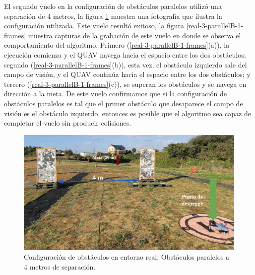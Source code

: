 El segundo vuelo en la configuración de obstáculos paralelos utilizó una separación de 4 metros, la figura \ref{real-3-parallelB-0-config} muestra una fotografía que ilustra la configuración utilizada. Este vuelo resultó exitoso, la figura \ref{real-3-parallelB-1-frames} muestra capturas de la grabación de este vuelo en donde se observa el comportamiento del algoritmo. Primero (\ref{real-3-parallelB-1-frames}(a)), la ejecución comienza y el QUAV navega hacia el espacio entre los dos obstáculos; segundo (\ref{real-3-parallelB-1-frames}(b)), esta vez, el obstáculo izquierdo sale del campo de visión, y el QUAV continúa hacia el espacio entre los dos obstáculos; y tercero (\ref{real-3-parallelB-1-frames}(c)), se superan los obstáculos y se navega en dirección a la meta. De este vuelo confirmamos que si la configuración de obstáculos paralelos es tal que el primer obstáculo que desaparece el campo de visión es el obstáculo izquierdo, entonces es posible que el algoritmo sea capaz de completar el vuelo sin producir colisiones.

\begin{figure}[H]
    \centering
    \includegraphics[scale=0.27]{partes/ImgJoao/real-3-parallelB-0-config.png}
    \caption[Configuración de obstáculos en entorno real: Obstáculos paralelos a 4 metros de separación.]{Configuración de obstáculos en entorno real: Obstáculos paralelos a 4 metros de separación.}
    \label{real-3-parallelB-0-config}
\end{figure}

